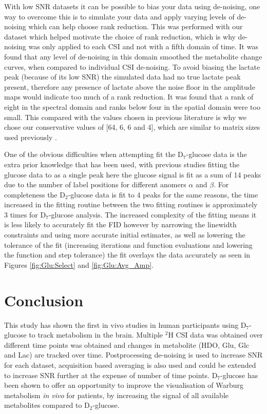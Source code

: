 With low \ac{SNR} datasets it can be possible to bias your data using de-noising, one way to overcome this is to simulate your data and apply varying levels of de-noising which can help choose rank reduction. This was performed with our dataset which helped motivate the choice of rank reduction, which is why de-noising was only applied to each \ac{CSI} and not with a fifth domain of time. It was found that any level of de-noising in this domain smoothed the metabolite change curves, when compared to individual \ac{CSI} de-noising. To avoid biasing the lactate peak (because of its low \ac{SNR}) the simulated data had no true lactate peak present, therefore any presence of lactate above the noise floor in the amplitude maps would indicate too much of a rank reduction. It was found that a rank of eight in the spectral domain and ranks below four in the spatial domain were too small. This compared with the values chosen in previous literature is why we chose our conservative values of [64, 6, 6 and 4], which are similar to matrix sizes used previously \cite{vonMorze2021ComparisonT, Kreis2020MeasuringMRI}. 

One of the obvious difficulties when attempting fit the D$_7$-glucose data is the extra prior knowledge that has been used, with previous studies fitting the glucose data to as a single peak here the glucose signal is fit as a sum of 14 peaks due to the number of label positions for different anomers $\alpha$ and $\beta$. For completeness the D$_2$-glucose data is fit to 4 peaks for the same reasons, the time increased in the fitting routine between the two fitting routines is approximately 3 times for D$_7$-glucose analysis. The increased complexity of the fitting means it is less likely to accurately fit the \ac{FID} however by narrowing the linewidth constraints and using more accurate initial estimates, as well as lowering the tolerance of the fit (increasing iterations and function evaluations and lowering the function and step tolerance) the fit overlays the data accurately as seen in Figures \ref{fig:Glu:Select} and \ref{fig:Glu:Avg_Amp}. 

\section{Conclusion}

This study has shown the first in vivo studies in human participants using D$_7$-glucose to track metabolism in the brain. Multiple $^2$H \ac{CSI} data was obtained over different time points was obtained and changes in metabolite (\ac{HDO}, Glu, Glc and Lac) are tracked over time. Postprocessing de-noising is used to increase \ac{SNR} for each dataset, acquisition based averaging is also used and could be extended to increase \ac{SNR} further at the expense of number of time points. D$_7$-glucose has been shown to offer an opportunity to improve the visualisation of Warburg metabolism \textit{in vivo} for patients, by increasing the signal of all available metabolites compared to D$_2$-glucose. 